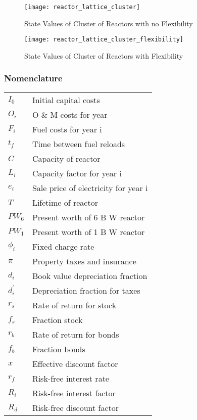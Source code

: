 \begin{figure}
\centering
\texttt{[image: reactor\_lattice\_cluster]}
\caption{  State Values of Cluster of Reactors with no Flexibility  }
\end{figure} 


\begin{figure}
\centering
\texttt{[image: reactor\_lattice\_cluster\_flexibility]}
\caption{  State Values of Cluster of Reactors with Flexibility  }
\end{figure}



\subsubsection{Nomenclature}

\begin{tabular}{ l l }
$I_0$ 	&	 Initial capital costs	\\
$O_i$ 	&	 O \& M costs for year \\
$F_i$	&	 Fuel costs for year i  \\
$t_f$	&	 Time between fuel reloads  \\
$C$	&	 Capacity of reactor  \\
$L_i$	&	 Capacity factor for year i   \\
$e_i$	&	Sale price of electricity for year i  \\
$T$	&	 Lifetime of reactor  \\
$PW_6$&	 Present worth of 6 B W reactor  \\
$PW_1$&	 Present worth of 1 B W reactor  \\
$\phi_i$	&	 Fixed charge rate  \\
$\pi $	&	 Property taxes and insurance  \\
$d_i$	&	 Book value depreciation fraction  \\
$d_i^\prime$	&	 Depreciation fraction for taxes  \\
$r_s$	&	 Rate of return for stock  \\
$f_s$	&	 Fraction stock  \\
$r_b$	&	 Rate of return for bonds  \\
$f_b$	&	 Fraction bonds  \\
$x$	&	 Effective discount factor   \\
$r_f$	&	 Risk-free interest rate  \\
$R_i$	&	 Risk-free interest factor  \\
$R_d$	&	 Risk-free discount factor  \\

\end{tabular}
